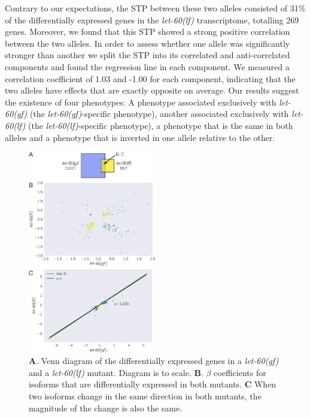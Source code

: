 \documentclass[10pt, onecolumn]{article}
\newcommand{\gene}[1]{\mbox{\emph{#1}}}
\newcommand{\letgf}{\gene{let-60(gf)}}
\newcommand{\letlf}{\gene{let-60(lf)}}
\begin{document}
Contrary to our expectations, the STP between these two alleles consisted of
31\% of the differentially expressed genes in the \letlf{} transcriptome,
totalling 269 genes. Moreover, we found that this STP showed a strong positive
correlation between the two alleles. In order to assess whether one allele was
significantly stronger than another we split the STP into its correlated and
anti-correlated components and found the regression line in each component. We
measured a correlation coefficient of 1.03 and -1.00 for each component,
indicating that the two alleles have effects that are exactly opposite on
average. Our results suggest the existence of four phenotypes: A phenotype
associated exclusively with \letgf{} (the \letgf{}-specific phenotype), another
associated exclusively with \letlf{} (the \letlf{}-specific phenotype), a
phenotype that is the same in both alleles and a phenotype that is inverted in
one allele relative to the other.

\begin{figure}
  \centering{}
  \includegraphics[width=0.5\textwidth]{../figs/ras_allele_plots.pdf}
  \caption{
    \textbf{A}. Venn diagram of the differentially expressed genes in a \letgf{}
    and a \letlf{} mutant. Diagram is to scale.
    \textbf{B}. $\beta$ coefficients for isoforms that are differentially
    expressed in both mutants.
    \textbf{C} When two isoforms change in the same direction in both mutants,
    the magnitude of the change is also the same.
  }
\label{fig:rasplots}
\end{figure}
\end{document}
